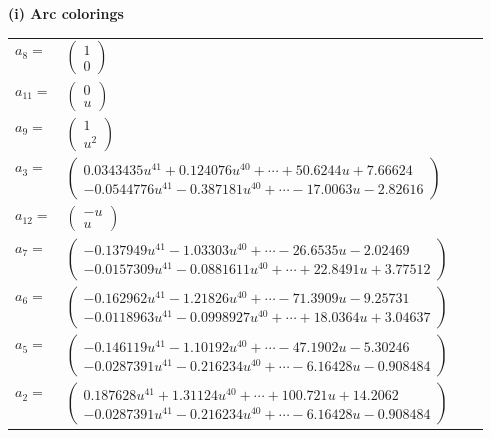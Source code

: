 \documentclass[1p]{elsarticle_modified}
\theoremstyle{definition}
\begin{document}
\flushleft \textbf{(i) Arc colorings}\\
\begin{tabular}{m{7pt} m{180pt} m{7pt} m{180pt} }
\flushright $a_{8}=$&$\begin{pmatrix}1\\0\end{pmatrix}$ \\
\flushright $a_{11}=$&$\begin{pmatrix}0\\u\end{pmatrix}$ \\
\flushright $a_{9}=$&$\begin{pmatrix}1\\u^2\end{pmatrix}$ \\
\flushright $a_{3}=$&$\begin{pmatrix}0.0343435 u^{41}+0.124076 u^{40}+\cdots+50.6244 u+7.66624\\-0.0544776 u^{41}-0.387181 u^{40}+\cdots-17.0063 u-2.82616\end{pmatrix}$ \\
\flushright $a_{12}=$&$\begin{pmatrix}- u\\u\end{pmatrix}$ \\
\flushright $a_{7}=$&$\begin{pmatrix}-0.137949 u^{41}-1.03303 u^{40}+\cdots-26.6535 u-2.02469\\-0.0157309 u^{41}-0.0881611 u^{40}+\cdots+22.8491 u+3.77512\end{pmatrix}$ \\
\flushright $a_{6}=$&$\begin{pmatrix}-0.162962 u^{41}-1.21826 u^{40}+\cdots-71.3909 u-9.25731\\-0.0118963 u^{41}-0.0998927 u^{40}+\cdots+18.0364 u+3.04637\end{pmatrix}$ \\
\flushright $a_{5}=$&$\begin{pmatrix}-0.146119 u^{41}-1.10192 u^{40}+\cdots-47.1902 u-5.30246\\-0.0287391 u^{41}-0.216234 u^{40}+\cdots-6.16428 u-0.908484\end{pmatrix}$ \\
\flushright $a_{2}=$&$\begin{pmatrix}0.187628 u^{41}+1.31124 u^{40}+\cdots+100.721 u+14.2062\\-0.0287391 u^{41}-0.216234 u^{40}+\cdots-6.16428 u-0.908484\end{pmatrix}$ \\

\end{tabular}
\end{document}
